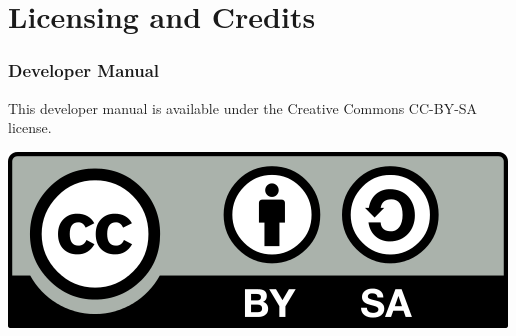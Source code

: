 \chapter{Licensing and Credits}


\subsection*{Developer Manual}
This developer manual is available under the Creative Commons CC-BY-SA license.

\begin{center}
	\includegraphics[width=.2\textwidth]{images/CC-BY-SA_500.png}
\end{center}

\bigskip




\newpage







